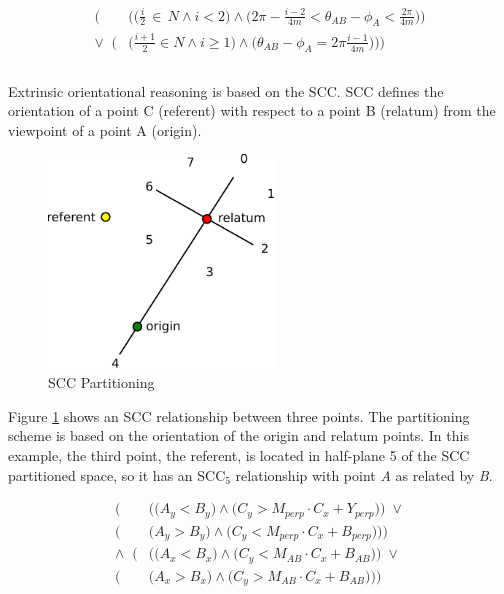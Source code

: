 \documentclass[12pt]{ucthesis}
\begin{document}
\begin{equation}\label{opra-eq}
\begin{aligned}
\Big(&\Big(\Big(\frac{i}{2} \, \in \, N \wedge i < 2\Big) \wedge \Big(2\pi - \frac{i-2}{4m} < \theta_{AB} - \phi_{A} < \frac{2\pi}{4m}\Big)\Big) \\
\lor \;\; \Big(&\Big(\frac{i+1}{2} \in N \wedge i \geq 1\Big) \wedge \Big(\theta_{AB} - \phi_{A} = 2\pi \frac{i-1}{4m}\Big)\Big)\Big) \\ \\
\end{aligned}
\end{equation}

Extrinsic orientational reasoning is based on the SCC. SCC defines the orientation of a point C (referent) with respect to a point B (relatum) from the viewpoint of a point A (origin).

\begin{figure}[H]
\centering
\includegraphics[width=60mm]{scc}
\caption{SCC Partitioning}
\label{scc}
\end{figure}

Figure \ref{scc} shows an SCC relationship between three points. The partitioning scheme is based on the orientation of the origin and relatum points. In this example, the third point, the referent, is located in half-plane 5 of the SCC partitioned space, so it has an SCC$_{5}$ relationship with point \emph{A} as related by \emph{B}. 

\begin{equation}\label{scc-eq} 
\begin{aligned}
\Big(&\Big(\Big(A_{y} < B_{y}\Big) \wedge \Big(C_{y} > M_{perp} \cdot C_{x} + Y_{perp}\Big)\Big) \; \lor \\
\Big(&\Big(A_{y} > B_{y}\Big) \wedge \Big(C_{y} < M_{perp} \cdot C_{x} + B_{perp}\Big)\Big)\Big) \\
\wedge \;\; \Big(&\Big(\Big(A_{x} < B_{x}\Big) \wedge \Big(C_{y} < M_{AB} \cdot C_{x} + B_{AB}\Big)\Big) \; \lor \\
\Big(&\Big(A_{x} > B_{x}\Big) \wedge \Big(C_{y} > M_{AB} \cdot C_{x} + B_{AB}\Big)\Big)\Big) \\
\end{aligned}
\end{equation}
\end{document}
